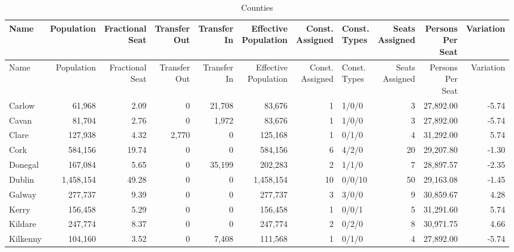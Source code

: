 \documentclass[a4paper]{article}
\begin{document}
\begin{longtable}{lrrrrrrlrrr}
\caption{Counties}
\\ \toprule
Name &Population &\shortstack{Fractional\\Seat} &\shortstack{Transfer\\Out} &\shortstack{Transfer\\In} &\shortstack{Effective\\Population} &\shortstack{Const.\\Assigned} &\shortstack{Const.\\Types} &\shortstack{Seats\\Assigned} &\shortstack{Persons\\Per\\Seat} &Variation \\ \midrule
\endfirsthead
\toprule
Name &Population &\shortstack{Fractional\\Seat} &\shortstack{Transfer\\Out} &\shortstack{Transfer\\In} &\shortstack{Effective\\Population} &\shortstack{Const.\\Assigned} &\shortstack{Const.\\Types} &\shortstack{Seats\\Assigned} &\shortstack{Persons\\Per\\Seat} &Variation \\ \midrule
\endhead
\bottomrule
\endfoot
Carlow&61,968& 2.09&0&21,708&83,676&1&1/0/0&3&27,892.00&-5.74\\ 
Cavan&81,704& 2.76&0&1,972&83,676&1&1/0/0&3&27,892.00&-5.74\\ 
Clare&127,938& 4.32&2,770&0&125,168&1&0/1/0&4&31,292.00& 5.74\\ 
Cork&584,156&19.74&0&0&584,156&6&4/2/0&20&29,207.80&-1.30\\ 
Donegal&167,084& 5.65&0&35,199&202,283&2&1/1/0&7&28,897.57&-2.35\\ 
Dublin&1,458,154&49.28&0&0&1,458,154&10&0/0/10&50&29,163.08&-1.45\\ 
Galway&277,737& 9.39&0&0&277,737&3&3/0/0&9&30,859.67& 4.28\\ 
Kerry&156,458& 5.29&0&0&156,458&1&0/0/1&5&31,291.60& 5.74\\ 
Kildare&247,774& 8.37&0&0&247,774&2&0/2/0&8&30,971.75& 4.66\\ 
Kilkenny&104,160& 3.52&0&7,408&111,568&1&0/1/0&4&27,892.00&-5.74\\ 

\end{longtable}
\end{document}
